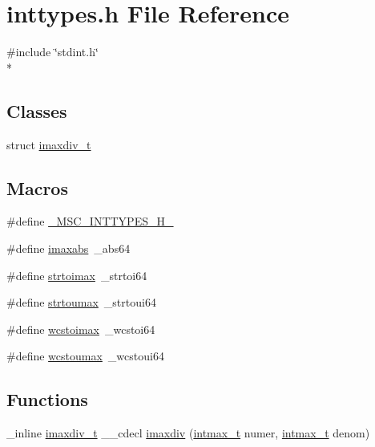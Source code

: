 \section{inttypes.\-h File Reference}
\label{inttypes_8h}
{\ttfamily \#include \char`\"{}stdint.\-h\char`\"{}}\\*
\subsection*{Classes}
\begin{DoxyCompactItemize}
\item 
struct \hyperlink{structimaxdiv__t}{imaxdiv\-\_\-t}
\end{DoxyCompactItemize}
\subsection*{Macros}
\begin{DoxyCompactItemize}
\item 
\#define \hyperlink{inttypes_8h_a6e905407c2795cfc9b42726c3758814d}{\-\_\-\-M\-S\-C\-\_\-\-I\-N\-T\-T\-Y\-P\-E\-S\-\_\-\-H\-\_\-}
\item 
\#define \hyperlink{inttypes_8h_ae79e51adb5d28d1b1119d29ed234334e}{imaxabs}~\-\_\-abs64
\item 
\#define \hyperlink{inttypes_8h_a6c62bc37cb56c347fa44835c4a0bf64c}{strtoimax}~\-\_\-strtoi64
\item 
\#define \hyperlink{inttypes_8h_a1289c6c6d3d867956e1532e2416b363d}{strtoumax}~\-\_\-strtoui64
\item 
\#define \hyperlink{inttypes_8h_ae026595b1dcc98cdb66cb46381225188}{wcstoimax}~\-\_\-wcstoi64
\item 
\#define \hyperlink{inttypes_8h_a32fa60d80a8e42a3290fb49c8865a4d0}{wcstoumax}~\-\_\-wcstoui64
\end{DoxyCompactItemize}
\subsection*{Functions}
\begin{DoxyCompactItemize}
\item 
\-\_\-inline \hyperlink{structimaxdiv__t}{imaxdiv\-\_\-t} \-\_\-\-\_\-cdecl \hyperlink{inttypes_8h_a8cb1de760b0fde0bae9eb5e070f0bce7}{imaxdiv} (\hyperlink{orstdint_8h_a1a3f3321a0166a004bde0a1e72553f2b}{intmax\-\_\-t} numer, \hyperlink{orstdint_8h_a1a3f3321a0166a004bde0a1e72553f2b}{intmax\-\_\-t} denom)
\end{DoxyCompactItemize}


